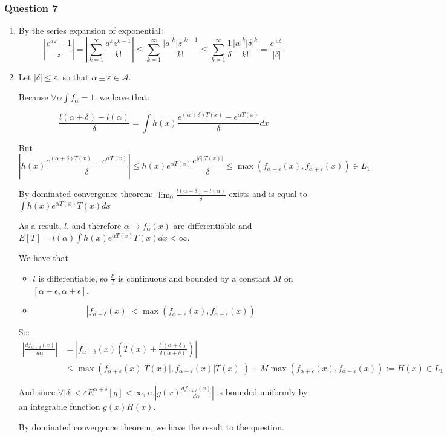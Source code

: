 \documentclass[12pt]{article}
\newcommand{\Q}[1]{\subsubsection*{Question #1}}
\begin{document}
\Q{7}
\begin{enumerate}

\item
By the series expansion of exponential:
$$|\frac{e^{az} - 1}{z}| = |\sum_{k=1}^{\infty} \frac{a^kz^{k-1}}{k!}|
\leq \sum_{k=1}^{\infty} \frac{|a|^k|z|^{k-1}}{k!}
\leq \sum_{k=1}^{\infty} \frac{1}{\delta} \frac{|a|^k|\delta|^{k}}{k!}
=\frac{e^{|a\delta|}}{|\delta|} 
$$
\item



Let $|\delta| \leq \varepsilon$, so that $\alpha \pm \varepsilon \in \mathcal A $.


Because $\forall \alpha \int f_\alpha = 1$, we have that:

$$
\frac{l(\alpha + \delta) - l(\alpha)}{\delta}
= \int h(x) \frac{e^{(\alpha + \delta)T(x)} - e^{\alpha T(x)}}{\delta} dx
$$


But
$$ |h(x) \frac{e^{(\alpha + \delta)T(x)} - e^{\alpha T(x)}}{\delta}| \leq h(x) e^{\alpha T(x)} \frac{e^{|\delta| |T(x)|}}{\delta} \leq \max(f_{\alpha-\varepsilon}(x), f_{\alpha+\varepsilon}(x)) \in L_1$$


By dominated convergence theorem: 
$\lim_0 \frac{l(\alpha + \delta) - l(\alpha)}{\delta}$ exists and is equal to $ \int h(x) e^{\alpha T(x)} T(x) dx$

As a result, $l$, and therefore $\alpha \rightarrow f_\alpha(x)$ are differentiable and $E[T] = l(\alpha)\int h(x) e^{\alpha T(x)} T(x) dx  < \infty$.

 We have that

\begin{itemize}

\item
$l$ is differentiable, so $\frac{l'}{l}$ is continuous and bounded by a constant $M$ on $[\alpha-\epsilon, \alpha+\epsilon]$.
\item
$$|f_{\alpha + \delta}(x)| < \max(f_{\alpha + \varepsilon}(x), f_{\alpha - \varepsilon}(x))$$
\end{itemize}

So:
\begin{align}|\frac{d f_{\alpha+\delta}(x)}{d\alpha}| 
&= |f_{\alpha+\delta}(x) (T(x) + \frac{l'(\alpha+\delta)}{l(\alpha+\delta)})| 
\\&\leq 
\max(f_{\alpha + \varepsilon}(x)|T(x)|, f_{\alpha - \varepsilon}(x)|T(x)|)
+ M \max(f_{\alpha + \varepsilon}(x), f_{\alpha - \varepsilon}(x)) := H(x)
\in L_1
\end{align}

And since $\forall |\delta| < \varepsilon E^{\alpha+\delta}[g] < \infty$, e $|g(x) \frac{d f_{\alpha+\delta}(x)}{d\alpha}|$ is bounded uniformly by an integrable function $g(x)H(x)$.

By dominated convergence theorem, we have the result to the question.

\end{enumerate}
\end{document}
